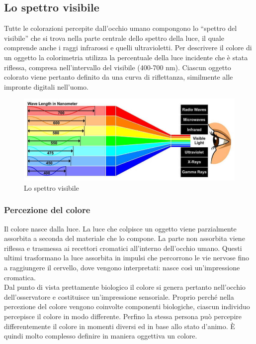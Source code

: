 \documentclass[a4paper,11pt]{article}
\begin{document}
        \subsection{Lo spettro visibile}
        Tutte le colorazioni percepite dall’occhio umano compongono lo “spettro del visibile” che si trova nella parte centrale dello spettro della luce, il quale
        comprende anche i raggi infrarossi e quelli ultravioletti. Per descrivere il colore di un oggetto la colorimetria utilizza la percentuale della luce incidente che è stata riflessa, compresa
        nell'intervallo del visibile (400-700 nm). Ciascun oggetto colorato viene pertanto definito da una curva di riflettanza, similmente alle impronte digitali
        nell’uomo. 
        \begin{figure}[h]
            \centering
            \includegraphics[scale=0.45]{colorimetria3}
            \caption{Lo spettro visibile}
        \end{figure}
        \newpage
        \subsubsection{Percezione del colore}
        Il colore nasce dalla luce. La luce che colpisce un oggetto viene parzialmente assorbita a
        seconda del materiale che lo compone. La parte non assorbita viene riflessa e trasmessa ai recettori cromatici
        all’interno dell’occhio umano. Questi ultimi trasformano la luce assorbita in impulsi che
        percorrono le vie nervose fino a raggiungere il cervello, dove vengono interpretati: nasce così
        un’impressione cromatica. \\
        Dal punto di vista prettamente biologico il colore si genera pertanto
        nell’occhio dell’osservatore e costituisce un’impressione sensoriale.
        Proprio perché nella percezione del colore vengono coinvolte componenti biologiche, ciascun individuo percepisce il colore in modo
        differente.
        Perfino la stessa persona può percepire differentemente il colore in momenti diversi ed in base
        allo stato d’animo. È quindi molto complesso definire in maniera oggettiva un colore.
\end{document}
